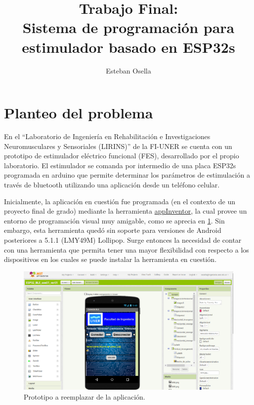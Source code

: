 \thispagestyle{firststyle}
\title{Trabajo Final:\\Sistema de programación para estimulador basado en {ESP32s}}
\author{Esteban Osella}
\maketitle
\thispagestyle{firststyle}

\onehalfspace
\section{Planteo del problema}
En el “Laboratorio de Ingeniería en Rehabilitación e Investigaciones Neuromusculares y Sensoriales (LIRINS)” de la FI-UNER se cuenta con un prototipo de estimulador eléctrico funcional (FES), desarrollado por el propio laboratorio. El estimulador se comanda por intermedio de una placa ESP32s programada en arduino que permite determinar los parámetros de estimulación a través de bluetooth utilizando una aplicación desde un teléfono celular. 

Inicialmente, la aplicación en cuestión fue programada (en el contexto de un proyecto final de grado) mediante la herramienta \href{http://ai2.appinventor.mit.edu/}{appInventor}, la cual provee un entorno de programación visual muy amigable, como se aprecia en \ref{fig:primer_prototipo}. Sin embargo, esta herramienta quedó sin soporte para versiones de Android posteriores a 5.1.1 (LMY49M) Lollipop. Surge entonces la necesidad de contar con una herramienta que permita tener una mayor flexibilidad con respecto a los dispositivos en los cuales se puede instalar la herramienta en cuestión. 

\begin{figure}[htb]
	\centering
		\includegraphics[width=1.00\textwidth]{figs/appInventor.png}
		\caption{Prototipo a reemplazar de la  aplicación.}
	\label{fig:primer_prototipo}
\end{figure}


